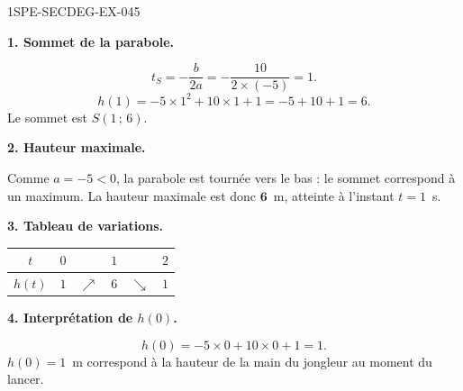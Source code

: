 \begin{corrige}{1SPE-SECDEG-EX-045}

\textbf{1. Sommet de la parabole.}


\[
t_S = -\frac{b}{2a} = -\frac{10}{2 \times (-5)} = 1.
\]
\[
h(1) = -5 \times 1^2 + 10 \times 1 + 1 = -5 + 10 + 1 = 6.
\]
Le sommet est $S(1\,;\,6)$.

\medskip
\textbf{2. Hauteur maximale.}

Comme $a = -5 < 0$, la parabole est tournée vers le bas : le sommet correspond à un maximum. La hauteur maximale est donc $\mathbf{6}$~m, atteinte à l'instant $t = 1$~s.

\medskip
\textbf{3. Tableau de variations.}

\begin{center}
\begin{tabular}{|c|ccccc|}
\hline
$t$ & $0$ & & $1$ & & $2$ \\
\hline
$h(t)$ & $1$ & $\nearrow$ & $6$ & $\searrow$ & $1$ \\
\hline
\end{tabular}
\end{center}

\medskip
\textbf{4. Interprétation de $h(0)$.}

\[
h(0) = -5 \times 0 + 10 \times 0 + 1 = 1.
\]
$h(0) = 1$~m correspond à la hauteur de la main du jongleur au moment du lancer.

\end{corrige}
